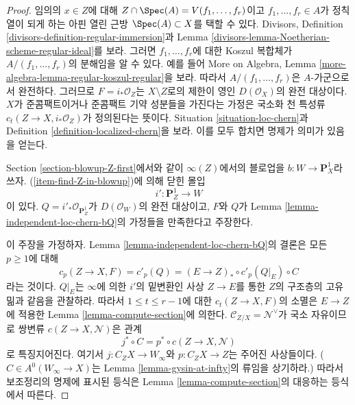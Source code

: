 \begin{proof}
임의의 $x \in Z$에 대해 $Z \cap \Spec(A) = V(f_1, \ldots, f_r)$이고
$f_1, \ldots, f_r \in A$가 정칙열이 되게 하는 아핀 열린 근방
$\Spec(A) \subset X$를 택할 수 있다. Divisors, Definition
\ref{divisors-definition-regular-immersion}과 Lemma
\ref{divisors-lemma-Noetherian-scheme-regular-ideal}를 보라. 그러면
$f_1, \ldots, f_r$에 대한 Koszul 복합체가
$A/(f_1, \ldots, f_r)$의 분해임을 알 수 있다. 예를 들어 More on
Algebra, Lemma \ref{more-algebra-lemma-regular-koszul-regular}을 보라.
따라서 $A/(f_1, \ldots, f_r)$은 $A$-가군으로서 완전하다. 그러므로
$F = i_*\mathcal{O}_Z$는 $X \setminus Z$로의 제한이 영인
$D(\mathcal{O}_X)$의 완전 대상이다. $X$가 준콤팩트이거나 준콤팩트
기약 성분들을 가진다는 가정은 국소화 천 특성류
$c_t(Z \to X, i_*\mathcal{O}_Z)$가 정의된다는 뜻이다. Situation
\ref{situation-loc-chern}과 Definition
\ref{definition-localized-chern}을 보라. 이를 모두 합치면 명제가
의미가 있음을 얻는다.

\medskip\noindent
Section \ref{section-blowup-Z-first}에서와 같이 $\infty(Z)$에서의
블로업을 $b : W \to \mathbf{P}^1_X$라 쓰자.
(\ref{item-find-Z-in-blowup})에 의해 닫힌 몰입
$$
i' : \mathbf{P}^1_Z \longrightarrow W
$$
이 있다. $Q = i'_*\mathcal{O}_{\mathbf{P}^1_Z}$가
$D(\mathcal{O}_W)$의 완전 대상이고, $F$와 $Q$가 Lemma
\ref{lemma-independent-loc-chern-bQ}의 가정들을 만족한다고 주장한다.

\medskip\noindent
이 주장을 가정하자. Lemma \ref{lemma-independent-loc-chern-bQ}의
결론은 모든 $p \geq 1$에 대해
$$
c_p(Z \to X, F) = c'_p(Q) = (E \to Z)_* \circ c'_p(Q|_E) \circ C
$$
라는 것이다. $Q|_E$는 $\infty$에 의한 $i'$의 밑변환인 사상
$Z \to E$를 통한 $Z$의 구조층의 고유 밂과 같음을 관찰하라. 따라서
$1 \leq t \leq r - 1$에 대한 $c_t(Z \to X, F)$의 소멸은
$E \to Z$에 적용한 Lemma \ref{lemma-compute-section}에 의한다.
$\mathcal{C}_{Z/X} = \mathcal{N}^\vee$가 국소 자유이므로 쌍변류
$c(Z \to X, \mathcal{N})$은 관계
$$
j^* \circ C = p^* \circ c(Z \to X, \mathcal{N})
$$
로 특징지어진다. 여기서 $j : C_ZX \to W_\infty$와
$p : C_ZX \to Z$는 주어진 사상들이다. ($C \in A^0(W_\infty \to X)$는
Lemma \ref{lemma-gysin-at-infty}의 류임을 상기하라.) 따라서 보조정리의
명제에 표시된 등식은 Lemma \ref{lemma-compute-section}의 대응하는
등식에서 따른다.


\end{proof}
